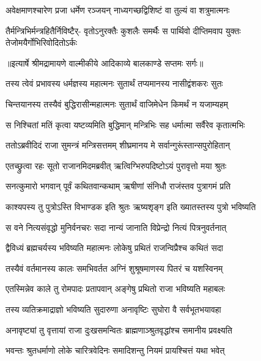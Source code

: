 \twolineshloka
{अवेक्षमाणश्चारेण प्रजा धर्मेण रञ्जयन्}
{नाध्यगच्छद्विशिष्टं वा तुल्यं वा शत्रुमात्मनः} %

\fourlineindentedshloka
{तैर्मन्त्रिभिर्मन्त्रहितैर्निविष्टैर्-}
{वृतोऽनुरक्तैः कुशलैः समर्थैः}
{स पार्थिवो दीप्तिमवाप युक्तः}
{तेजोमयैर्गोभिरिवोदितोऽर्कः} %


{॥इत्यार्षे श्रीमद्रामायणे वाल्मीकीये आदिकाव्ये बालकाण्डे सप्तमः सर्गः॥}


\twolineshloka
{तस्य त्वेवं प्रभावस्य धर्मज्ञस्य महात्मनः}
{सुतार्थं तप्यमानस्य नासीद्वंशकरः सुतः} %

\twolineshloka
{चिन्तयानस्य तस्यैवं बुद्धिरासीन्महात्मनः}
{सुतार्थं वाजिमेधेन किमर्थं न यजाम्यहम्} %

\twolineshloka
{स निश्चितां मतिं कृत्वा यष्टव्यमिति बुद्धिमान्}
{मन्त्रिभिः सह धर्मात्मा सर्वैरेव कृतात्मभिः} %

\twolineshloka
{ततोऽब्रवीदिदं राजा सुमन्त्रं मन्त्रिसत्तमम्}
{शीघ्रमानय मे सर्वान्गुरूंस्तान्सपुरोहितान्} %

\twolineshloka
{एतच्छ्रुत्वा रहः सूतो राजानमिदमब्रवीत्}
{ऋत्विग्भिरुपदिष्टोऽयं पुरावृत्तो मया श्रुतः} %

\twolineshloka
{सनत्कुमारो भगवान् पूर्वं कथितवान्कथाम्}
{ऋषीणां संनिधौ राजंस्तव पुत्रागमं प्रति} %

\twolineshloka
{काश्यपस्य तु पुत्रोऽस्ति विभाण्डक इति श्रुतः}
{ऋष्यशृङ्ग इति ख्यातस्तस्य पुत्रो भविष्यति} %

\twolineshloka
{स वने नित्यसंवृद्धो मुनिर्वनचरः सदा}
{नान्यं जानाति विप्रेन्द्रो नित्यं पित्रनुवर्तनात्} %

\twolineshloka
{द्वैविध्यं ब्रह्मचर्यस्य भविष्यति महात्मनः}
{लोकेषु प्रथितं राजन्विप्रैश्च कथितं सदा} %

\twolineshloka
{तस्यैवं वर्तमानस्य कालः समभिवर्तत}
{अग्निं शुश्रूषमाणस्य पितरं च यशस्विनम्} %

\twolineshloka
{एतस्मिन्नेव काले तु रोमपादः प्रतापवान्}
{अङ्गेषु प्रथितो राजा भविष्यति महाबलः} %

\twolineshloka
{तस्य व्यतिक्रमाद्राज्ञो भविष्यति सुदारुणा}
{अनावृष्टिः सुघोरा वै सर्वभूतभयावहा} %

\twolineshloka
{अनावृष्ट्यां तु वृत्तायां राजा दुःखसमन्वितः}
{ब्राह्मणाञ्श्रुतवृद्धांश्च समानीय प्रवक्ष्यति} %

\twolineshloka
{भवन्तः श्रुतधर्माणो लोके चारित्रवेदिनः}
{समादिशन्तु नियमं प्रायश्चित्तं यथा भवेत्} %

